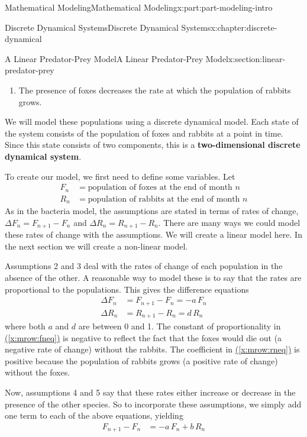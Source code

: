 \documentclass[oneside,10pt,]{book}
\newcommand{\xreffont}{\relax}
\newcommand{\terminology}[1]{\textbf{#1}}
\numberwithin{equation}{section}
\newcommand{\amp}{&}
\begin{document}
\begin{partptx}{Mathematical Modeling}{}{Mathematical Modeling}{}{}{x:part:part-modeling-intro}
\begin{chapterptx}{Discrete Dynamical Systems}{}{Discrete Dynamical Systems}{}{}{x:chapter:discrete-dynamical}
\begin{sectionptx}{A Linear Predator-Prey Model}{}{A Linear Predator-Prey Model}{}{}{x:section:linear-predator-prey}
\begin{introduction}{}
\begin{enumerate}
\item{}The presence of foxes decreases the rate at which the population of rabbits grows.%
\end{enumerate}
We will model these populations using a discrete dynamical model.  Each state of the system consists of the population of foxes and rabbits at a point in time. Since this state consists of two components, this is a \terminology{two-dimensional discrete dynamical system}.%
\par
To create our model, we first need to define some variables. Let%
%
\begin{equation*}
\begin{aligned}
F_n \amp= \text{population of foxes at the end of month $n$} \\
R_n \amp= \text{population of rabbits at the end of month $n$}
\end{aligned}
\end{equation*}
As in the bacteria model, the assumptions are stated in terms of rates of change, \(\Delta F_n = F_{n+1} - F_n\) and \(\Delta R_n = R_{n+1} - R_n\).  There are many ways we could model these rates of change with the assumptions.  We will create a linear model here. In the next section we will create a non-linear model.%
\par
Assumptions 2 and 3 deal with the rates of change of each population in the absence of the other.  A reasonable way to model these is to say that the rates are proportional to the populations.  This gives the difference equations%
%
\begin{align}
\Delta F_n \amp= F_{n+1} - F_n = -a\,F_n \label{x:mrow:fneq}\\
\Delta R_n \amp= R_{n+1} - R_n = d\,R_n \label{x:mrow:rneq}
\end{align}
where both \(a\) and \(d\) are between 0 and 1.  The constant of proportionality in \hyperref[x:mrow:fneq]{({\xreffont\ref{x:mrow:fneq}})} is negative to reflect the fact that the foxes would die out (a negative rate of change) without the rabbits. The coefficient in \hyperref[x:mrow:rneq]{({\xreffont\ref{x:mrow:rneq}})} is positive because the population of rabbits grows (a positive rate of change) without the foxes.%
\par
Now, assumptions 4 and 5 say that these rates either increase or decrease in the presence of the other species.  So to incorporate these assumptions, we simply add one term to each of the above equations, yielding%
%
\begin{align}
F_{n+1} - F_n \amp= -a\,F_n + b\,R_n \label{x:mrow:fneq2}\\

\end{align}
\end{introduction}
\end{sectionptx}
\end{chapterptx}
\end{partptx}
\end{document}
